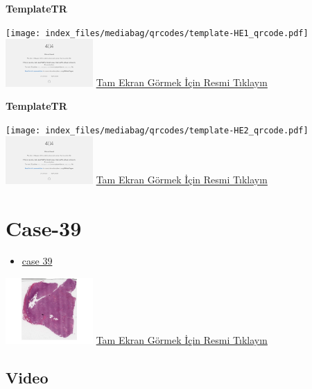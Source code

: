 \documentclass[
  letterpaper,
  DIV=11,
  numbers=noendperiod]{scrreprt}
\providecommand{\tightlist}{%
  \setlength{\itemsep}{0pt}\setlength{\parskip}{0pt}}\usepackage{longtable,booktabs,array}
\begin{document}
\textbf{TemplateTR}

\texttt{[image: index\_files/mediabag/qrcodes/template-HE1\_qrcode.pdf]}
\href{https://images.patolojiatlasi.com/template/HE1.html}{\includegraphics[width=0.25\textwidth,height=\textheight]{./screenshots/thumbnail_template-HE1.png}}
\href{https://images.patolojiatlasi.com/template/HE1.html}{Tam Ekran
Görmek İçin Resmi Tıklayın}

\textbf{TemplateTR}

\texttt{[image: index\_files/mediabag/qrcodes/template-HE2\_qrcode.pdf]}
\href{https://images.patolojiatlasi.com/template/HE2.html}{\includegraphics[width=0.25\textwidth,height=\textheight]{./screenshots/thumbnail_template-HE2.png}}
\href{https://images.patolojiatlasi.com/template/HE2.html}{Tam Ekran
Görmek İçin Resmi Tıklayın}

\hypertarget{sec-hacettepe-case-of-the-month-case-39}{%
\section{Case-39}\label{sec-hacettepe-case-of-the-month-case-39}}

\begin{itemize}
\tightlist
\item
  \href{https://www.youtube.com/watch?v=q4nuIBROlZI&ab_channel=KemalKosemehmetoglu}{case
  39}
\end{itemize}

\href{https://images.patolojiatlasi.com/hacettepe-com-case-39/HE.html}{\includegraphics[width=0.25\textwidth,height=\textheight]{./screenshots/thumbnail_hacettepe-com-case-39.png}}
\href{https://images.patolojiatlasi.com/hacettepe-com-case-39/HE.html}{Tam
Ekran Görmek İçin Resmi Tıklayın}

\hypertarget{video-38}{%
\subsection{Video}\label{video-38}}
\end{document}
